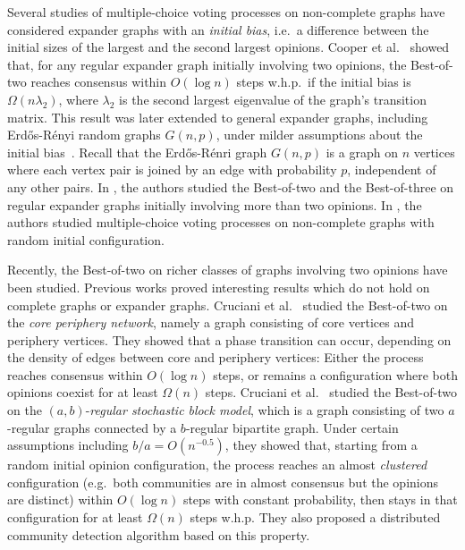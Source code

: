 \documentclass[letterpaper,11pt]{article}
\begin{document}
Several studies of multiple-choice voting processes on non-complete graphs have considered expander graphs with an {\em initial bias}, i.e.~a difference between the initial sizes of the largest and the second largest opinions.
Cooper et al.~\cite{CER14} showed that, for any regular expander graph initially involving two opinions, the Best-of-two reaches consensus within $O(\log n)$ steps w.h.p.~if the initial bias is $\Omega(n\lambda_2)$, where $\lambda_2$ is the second largest eigenvalue of the graph's transition matrix. 
This result was later extended to general expander graphs, including Erd\H{o}s-R\'enyi random graphs $G(n,p)$, under milder assumptions about the initial bias~\cite{CERRS15}.
Recall that the Erd\H{o}s-R\'enri graph $G(n,p)$ is a graph on $n$ vertices where each vertex pair is joined by an edge with probability $p$, independent of any other pairs.
In \cite{CRRS17}, the authors studied the Best-of-two and the Best-of-three on regular expander graphs initially involving more than two opinions.
In \cite{AD15,KR19}, the authors studied multiple-choice voting processes on non-complete graphs with random initial configuration.


Recently, the Best-of-two on richer classes of graphs involving two opinions have been studied.
Previous works proved interesting results which do not hold on complete graphs or expander graphs.
Cruciani et al.~\cite{CNNS18} studied the Best-of-two on the {\em core periphery network}, namely a graph consisting of core vertices and periphery vertices.
They showed that a phase transition can occur, depending on the density of edges between  core and periphery vertices: 
Either the process reaches consensus within $O(\log n)$ steps, 
or remains a configuration where both opinions coexist for at least $\Omega(n)$ steps.
Cruciani et al.~\cite{CNS19} studied the Best-of-two on the $(a,b)$-{\em regular stochastic block model}, which is a graph consisting of two $a$-regular graphs connected by a $b$-regular bipartite graph.
Under certain assumptions including $b/a=O(n^{-0.5})$, they showed that, starting from a random initial opinion configuration, the process reaches an almost {\em clustered} configuration (e.g.~both communities are in almost consensus but the opinions are distinct) within $O(\log n)$ steps with constant probability, then stays in that configuration for at least $\Omega(n)$ steps w.h.p.
They also proposed a distributed community detection algorithm based on this property. 
%
\end{document}
